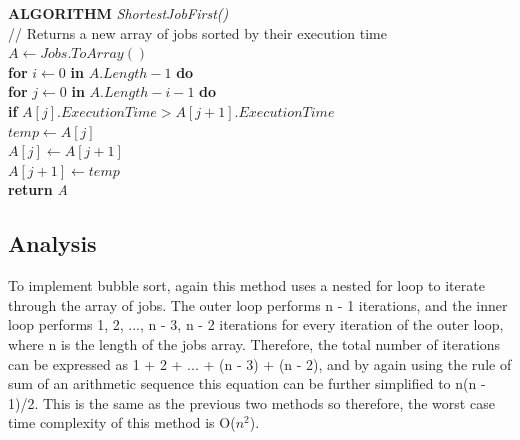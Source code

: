 \documentclass[12pt,a4paper]{article}
\begin{document}
			\textbf{ALGORITHM} \textit{ShortestJobFirst()}\\
			\null\hspace{1cm}// Returns a new array of jobs sorted by their execution time\\
			\null\hspace{1cm}\textit{$A \gets Jobs.ToArray()$}\\
			\null\hspace{1cm}\textbf{for} \textit{$i \gets 0$} \textbf{in} \textit{$A.Length - 1$} \textbf{do}\\
			\null\hspace{2cm}\textbf{for} \textit{$j \gets 0$} \textbf{in} \textit{$A.Length - i - 1$} \textbf{do}\\
			\null\hspace{3cm}\textbf{if} \textit{$A[j].ExecutionTime > A[j + 1].ExecutionTime$}\\
			\null\hspace{4cm}\textit{$temp \gets A[j]$}\\
			\null\hspace{4cm}\textit{$A[j] \gets A[j + 1]$}\\
			\null\hspace{4cm}\textit{$A[j + 1] \gets temp$}\\
			\null\hspace{1cm}\textbf{return} \textit{A}\\

		\subsection{Analysis}
			To implement bubble sort, again this method uses a nested for loop to iterate through the array of 
			jobs. The outer loop performs n - 1 iterations, and the inner loop performs 1, 2, ..., n - 3, n - 2 
			iterations for every iteration of the outer loop, where n is the length of the jobs array. Therefore, 
			the total number of iterations can be expressed as 1 + 2 + ... + (n - 3) + (n - 2), and by again 
			using the rule of sum of an arithmetic sequence this equation can be further simplified to n(n - 1)/2. 
			This is the same as the previous two methods so therefore, the worst case time complexity of this 
			method is O($n ^ 2$).\\

		\newpage
\end{document}
